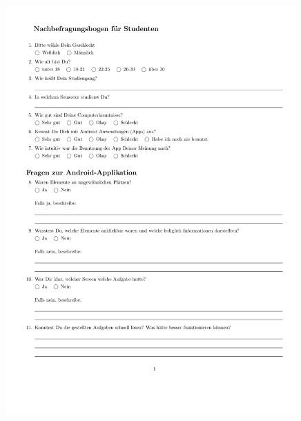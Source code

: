 \begin{figure}
  \vspace{-20pt}
  \begin{center}
    \includegraphics[page=1,width=0.99\textwidth]{./images/student}
  \end{center}
  \vspace{-40pt}
\end{figure}


